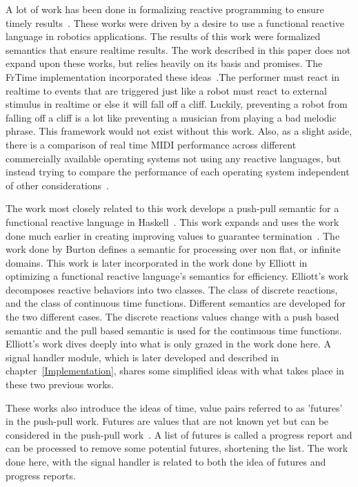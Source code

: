 \documentclass[12pt]{ucthesis}
\begin{document}
A lot of work has been done in formalizing reactive programming to ensure timely results~\cite{EventDriven}\cite{RealTime}. These works were driven by a desire to use a functional reactive language in robotics applications. The results of this work were formalized semantics that ensure realtime results. The work described in this paper does not expand upon these works, but relies heavily on its basis and promises. The FrTime implementation incorporated these ideas~\cite{FrTime}.The performer must react in realtime to events that are triggered just like a robot must react to external stimulus in realtime or else it will fall off a cliff. Luckily, preventing a robot from falling off a cliff is a lot like preventing a musician from playing a bad melodic phrase. This framework would not exist without this work. Also, as a slight aside, there is a comparison of real time MIDI performance across different commercially available operating systems not using any reactive languages, but instead trying to compare the performance of each operating system independent of other considerations~\cite{real-time-midi}.

The work most closely related to this work develops a push-pull semantic for a functional reactive language in Haskell~\cite{push-pull-frp}. This work expands and uses the work done much earlier in creating improving values to guarantee termination~\cite{historic-paper}. The work done by Burton defines a semantic for processing over non flat, or infinite domains. This work is later incorporated in the work done by Elliott in optimizing a functional reactive language's semantics for efficiency. Elliott's work decomposes reactive behaviors into two classes. The class of discrete reactions, and the class of continuous time functions. Different semantics are developed for the two different cases. The discrete reactions values change with a push based semantic and the pull based semantic is used for the continuous time functions. Elliott's work dives deeply into what is only grazed in the work done here. A signal handler module, which is later developed and described in chapter~\ref{Implementation}, shares some simplified ideas with what takes place in these two previous works. 

These works also introduce the ideas of time, value pairs referred to as 'futures' in the push-pull work. Futures are values that are not known yet but can be considered in the push-pull work~\cite{push-pull-frp}. A list of futures is called a progress report and can be processed to remove some potential futures, shortening the list. The work done here, with the signal handler is related to both the idea of futures and progress reports. 
\end{document}
